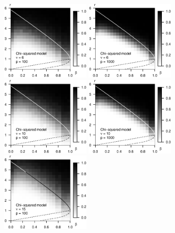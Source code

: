 \begin{figure}
      \centering
      \includegraphics[width=0.4\textwidth]{./simulated_phase_diagram_chi-squared_nu6_p100.eps}
      \includegraphics[width=0.4\textwidth]{./simulated_phase_diagram_chi-squared_nu6_p10000.eps}
      \includegraphics[width=0.4\textwidth]{./simulated_phase_diagram_chi-squared_nu10_p100.eps}
      \includegraphics[width=0.4\textwidth]{./simulated_phase_diagram_chi-squared_nu10_p10000.eps}
      \includegraphics[width=0.4\textwidth]{./simulated_phase_diagram_chi-squared_nu15_p100.eps}

\end{figure}
